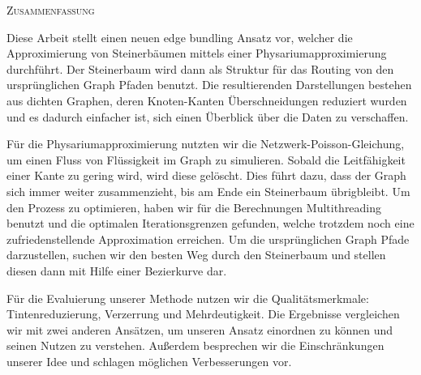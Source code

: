 
\begin{center}
  \textsc{Zusammenfassung}
\end{center}
%
\noindent 

Diese Arbeit stellt einen neuen edge bundling Ansatz vor, welcher die Approximierung von Steinerbäumen mittels einer Physariumapproximierung durchführt. Der Steinerbaum wird dann als Struktur für das Routing von den ursprünglichen Graph Pfaden benutzt. Die resultierenden Darstellungen bestehen aus dichten Graphen, deren Knoten-Kanten Überschneidungen reduziert wurden und es dadurch einfacher ist, sich einen Überblick über die Daten zu verschaffen.

Für die Physariumapproximierung nutzten wir die Netzwerk-Poisson-Gleichung, um einen Fluss von Flüssigkeit im Graph zu simulieren. Sobald die Leitfähigkeit einer Kante zu gering wird, wird diese gelöscht. Dies führt dazu, dass der Graph sich immer weiter zusammenzieht, bis am Ende ein Steinerbaum übrigbleibt. Um den Prozess zu optimieren, haben wir für die Berechnungen Multithreading benutzt und die optimalen Iterationsgrenzen gefunden, welche trotzdem noch eine zufriedenstellende Approximation erreichen.
Um die ursprünglichen Graph Pfade darzustellen, suchen wir den besten Weg durch den Steinerbaum und stellen diesen dann mit Hilfe einer Bezierkurve dar.

Für die Evaluierung unserer Methode nutzen wir die Qualitätsmerkmale: Tintenreduzierung, Verzerrung und Mehrdeutigkeit. Die Ergebnisse vergleichen wir mit zwei anderen Ansätzen, um unseren Ansatz einordnen zu können und seinen Nutzen zu verstehen. Außerdem besprechen wir die Einschränkungen unserer Idee und schlagen möglichen Verbesserungen vor.

\cleardoublepage
